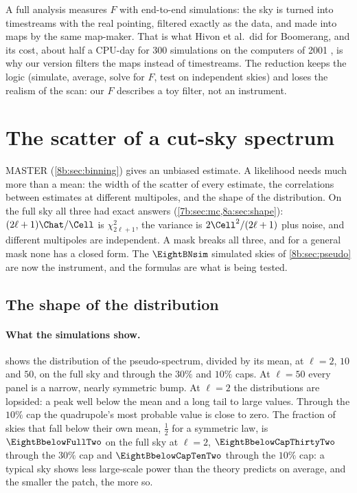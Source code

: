 A full analysis measures $F$ with end-to-end simulations: the sky is turned into timestreams with
the real pointing, filtered exactly as the data, and made into maps by the same map-maker. That is
what Hivon et al.\ did for Boomerang, and its cost, about half a CPU-day for $300$ simulations on the
computers of 2001 , is why our version filters the maps instead of timestreams.
The reduction keeps the logic (simulate, average, solve for $F$, test on independent skies) and
loses the realism of the scan: our $F$ describes a toy filter, not an instrument.
\section{The scatter of a cut-sky spectrum}
\label{8b:sec:distribution}

MASTER (\cref{8b:sec:binning}) gives an unbiased estimate. A likelihood needs much more than a
mean: the width of the scatter of every estimate, the correlations between estimates at
different multipoles, and the shape of the distribution. On the full sky all three had exact
answers (\cref{7b:sec:mc,8a:sec:shape}): $(2\ell+1)\Chat/\Cell$ is $\chi^2_{2\ell+1}$, the variance is
$2\Cell^2/(2\ell+1)$ plus noise, and different multipoles are independent. A mask breaks all three, and
for a general mask none has a closed form. The $\EightBNsim$ simulated skies of \cref{8b:sec:pseudo}
are now the instrument, and the formulas are what is being tested.

\subsection{The shape of the distribution}
\label{8b:sec:shape-cut}

\paragraph{What the simulations show.}
 shows the distribution of the pseudo-spectrum, divided by its mean, at
$\ell=2$, $10$ and $50$, on the full sky and through the $30\%$ and $10\%$ caps. At $\ell=50$ every panel
is a narrow, nearly symmetric bump. At $\ell=2$ the distributions are lopsided: a peak well below the
mean and a long tail to large values. Through the $10\%$ cap the quadrupole's most probable value is
close to zero. The fraction of skies that fall below their own mean, $\frac12$ for a symmetric law, is
$\EightBbelowFullTwo$ on the full sky at $\ell=2$, $\EightBbelowCapThirtyTwo$ through the $30\%$ cap and
$\EightBbelowCapTenTwo$ through the $10\%$ cap: a typical sky shows less large-scale power than the theory
predicts on average, and the smaller the patch, the more so.


